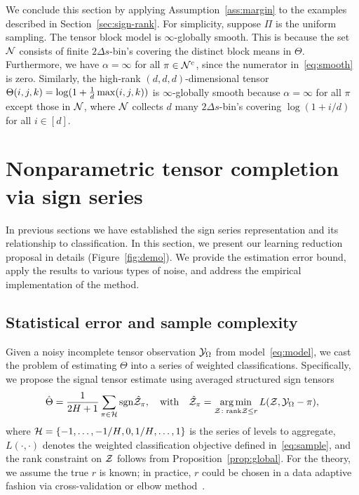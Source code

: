 \documentclass[twoside,11pt]{article}
\theoremstyle{plain}
\theoremstyle{definition}
\def\sign{\textup{sgn}}
\begin{document}
We conclude this section by applying Assumption~\ref{ass:margin} to the examples described in Section~\ref{sec:sign-rank}. For simplicity, suppose $\Pi$ is the uniform sampling. 
The tensor block model is $\infty$-globally smooth. This is because the set $\mathcal{N}$ consists of finite $2\Delta s$-bin's covering the distinct block means in $\Theta$. Furthermore, we have $\alpha= \infty$ for all $\pi \in \mathcal{N}^c$, since the numerator in~\eqref{eq:smooth} is zero. Similarly, the high-rank $(d,d,d)$-dimensional tensor $\Theta(i,j,k) = \log(1+{1\over d}\max(i,j,k))$ is $\infty$-globally smooth because $\alpha=\infty$ for all $\pi$ except those in $\mathcal{N}$, where $\mathcal{N}$ collects $d$ many $2\Delta s$-bin's covering $\log(1+i/d)$ for all $i \in[d]$.


\section{Nonparametric tensor completion via sign series}\label{sec:estimation}

In previous sections we have established the sign series representation and its relationship to classification. In this section, we present our learning reduction proposal in details (Figure~\ref{fig:demo}). We provide the estimation error bound, apply the results to various types of noise, and address the empirical implementation of the method. 


\subsection{Statistical error and sample complexity}\label{sec:error}
Given a noisy incomplete tensor observation $\mathcal{Y}_\Omega$ from model~\eqref{eq:model}, we cast the problem of estimating $\Theta$ into a series of weighted classifications. Specifically, we propose the signal tensor estimate using averaged structured sign tensors
\begin{equation}\label{eq:est}
\hat \Theta = {1\over 2H+1}\sum_{\pi \in \tH}\sign{\hat \tZ_\pi}, \quad \text{with}\quad \hat \tZ_\pi = \argmin_{\tZ\colon \text{rank}\tZ\leq r} L(\tZ, \tY_\Omega-\pi),
\end{equation}
where $\mathcal{H}=\{-1,\ldots,-{1/ H}, 0, {1/H},\ldots,1\}$ is the series of levels to aggregate, $L(\cdot,\cdot)$ denotes the weighted classification objective defined in~\eqref{eq:sample}, and the rank constraint on $\mathcal{Z}$ follows from Proposition~\ref{prop:global}. For the theory, we assume the true $r$ is known; in practice, $r$ could be chosen in a data adaptive fashion via cross-validation or elbow method~\citep{hastie2009elements}. 
\end{document}
